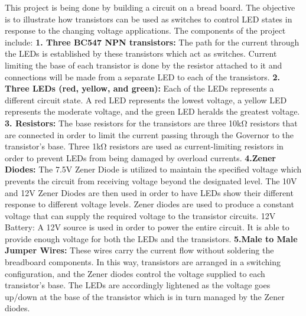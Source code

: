 This project is being done by building a circuit on a bread board. The objective is to illustrate how transistors can be used as switches to control LED states in response to the changing voltage applications. The components of the project include:
\newline \textbf{1. Three BC547 NPN transistors:}
\newline The path for the current through the LEDs is established by these transistors which act as switches. Current limiting the base of each transistor is done by the resistor attached to it and connections will be made from a separate LED to each of the transistors.\cite{b10}
\newline \textbf{2. Three LEDs (red, yellow, and green):} 
\newline Each of the LEDs represents a different circuit state. A red LED represents the lowest voltage, a yellow LED represents the moderate voltage, and the green LED heralds the greatest voltage.\cite{b12}
\newline \textbf{3. Resistors:}
\newline The base resistors for the transistors are three 10kΩ resistors that are connected in order to limit the current passing through the Governor to the transistor’s base.
\newline Three 1kΩ resistors are used as current-limiting resistors in order to prevent LEDs from being damaged by overload currents.
\newline \textbf{4.Zener Diodes:}
\newline The 7.5V Zener Diode is utilized to maintain the specified voltage which prevents the circuit from receiving voltage beyond the designated level.
\newline The 10V and 12V Zener Diodes are then used in order to have LEDs show their different response to different voltage levels. Zener diodes are used to produce a constant voltage that can supply the required voltage to the transistor circuits.
\newline 12V Battery: A 12V source is used in order to power the entire circuit. It is able to provide enough voltage for both the LEDs and the transistors.\cite{10}
\newline \textbf{5.Male to Male Jumper Wires:}
\newline These wires carry the current flow without soldering the breadboard components.
\newline In this way, transistors are arranged in a switching configuration, and the Zener diodes control the voltage supplied to each transistor's base. The LEDs are accordingly lightened as the voltage goes up/down at the base of the transistor which is in turn managed by the Zener diodes.




